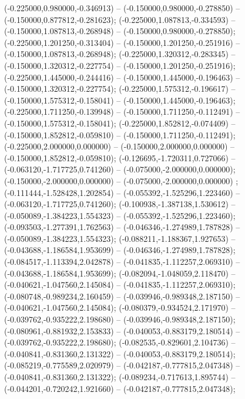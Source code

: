  (-0.225000,0.980000,-0.346913) -- (-0.150000,0.980000,-0.278850) -- (-0.150000,0.877812,-0.281623);
 (-0.225000,1.087813,-0.334593) -- (-0.150000,1.087813,-0.268948) -- (-0.150000,0.980000,-0.278850);
 (-0.225000,1.201250,-0.313404) -- (-0.150000,1.201250,-0.251916) -- (-0.150000,1.087813,-0.268948);
 (-0.225000,1.320312,-0.283345) -- (-0.150000,1.320312,-0.227754) -- (-0.150000,1.201250,-0.251916);
 (-0.225000,1.445000,-0.244416) -- (-0.150000,1.445000,-0.196463) -- (-0.150000,1.320312,-0.227754);
 (-0.225000,1.575312,-0.196617) -- (-0.150000,1.575312,-0.158041) -- (-0.150000,1.445000,-0.196463);
 (-0.225000,1.711250,-0.139948) -- (-0.150000,1.711250,-0.112491) -- (-0.150000,1.575312,-0.158041);
 (-0.225000,1.852812,-0.074409) -- (-0.150000,1.852812,-0.059810) -- (-0.150000,1.711250,-0.112491);
 (-0.225000,2.000000,0.000000) -- (-0.150000,2.000000,0.000000) -- (-0.150000,1.852812,-0.059810);
 (-0.126695,-1.720311,0.727066) -- (-0.063120,-1.717725,0.741260) -- (-0.075000,-2.000000,0.000000);
 (-0.150000,-2.000000,0.000000) -- (-0.075000,-2.000000,0.000000) ;
 (-0.111444,-1.528428,1.202854) -- (-0.055392,-1.525296,1.223460) -- (-0.063120,-1.717725,0.741260);
 (-0.100938,-1.387138,1.530612) -- (-0.050089,-1.384223,1.554323) -- (-0.055392,-1.525296,1.223460);
 (-0.093503,-1.277391,1.762563) -- (-0.046346,-1.274989,1.787828) -- (-0.050089,-1.384223,1.554323);
 (-0.088211,-1.188367,1.927653) -- (-0.043688,-1.186584,1.953699) -- (-0.046346,-1.274989,1.787828);
 (-0.084517,-1.113394,2.042878) -- (-0.041835,-1.112257,2.069310) -- (-0.043688,-1.186584,1.953699);
 (-0.082094,-1.048059,2.118470) -- (-0.040621,-1.047560,2.145084) -- (-0.041835,-1.112257,2.069310);
 (-0.080748,-0.989234,2.160459) -- (-0.039946,-0.989348,2.187150) -- (-0.040621,-1.047560,2.145084);
 (-0.080379,-0.934524,2.171970) -- (-0.039762,-0.935222,2.198680) -- (-0.039946,-0.989348,2.187150);
 (-0.080961,-0.881932,2.153833) -- (-0.040053,-0.883179,2.180514) -- (-0.039762,-0.935222,2.198680);
 (-0.082535,-0.829601,2.104736) -- (-0.040841,-0.831360,2.131322) -- (-0.040053,-0.883179,2.180514);
 (-0.085219,-0.775589,2.020979) -- (-0.042187,-0.777815,2.047348) -- (-0.040841,-0.831360,2.131322);
 (-0.089234,-0.717613,1.895744) -- (-0.044201,-0.720242,1.921660) -- (-0.042187,-0.777815,2.047348);
